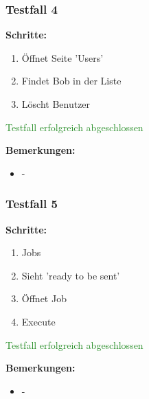 {\subsubsection*{Testfall 4}

\textbf{Schritte:}

\begin{enumerate}
    \item Öffnet Seite 'Users'
    \item Findet Bob in der Liste
    \item Löscht Benutzer
\end{enumerate}

\textcolor{ForestGreen}{Testfall erfolgreich abgeschlossen}

\bigskip
\textbf{Bemerkungen:}

\begin{itemize}[noitemsep,nolistsep]
    \item -
\end{itemize}

\subsubsection*{Testfall 5}

\textbf{Schritte:}

\begin{enumerate}
    \item Jobs
    \item Sieht 'ready to be sent'
    \item Öffnet Job
    \item Execute
\end{enumerate}

\textcolor{ForestGreen}{Testfall erfolgreich abgeschlossen}

\bigskip
\textbf{Bemerkungen:}

\begin{itemize}[noitemsep,nolistsep]
    \item -
\end{itemize}

}